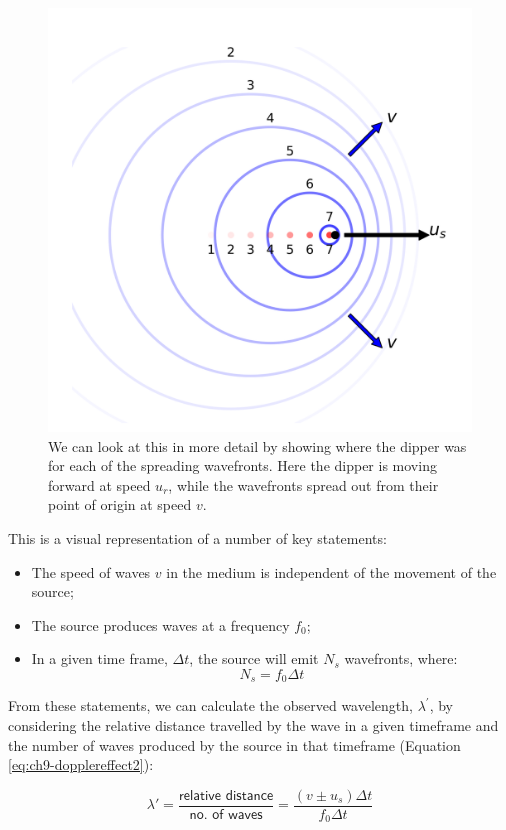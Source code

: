 \documentclass[
]{book}
\providecommand{\tightlist}{%
  \setlength{\itemsep}{0pt}\setlength{\parskip}{0pt}}
\begin{document}
\begin{figure}

{\centering \includegraphics[width=0.7\linewidth]{visualisations/ch9-doppler2} 

}

\caption{We can look at this in more detail by showing where the dipper was for each of the spreading wavefronts. Here the dipper is moving forward at speed $u_r$, while the wavefronts spread out from their point of origin at speed $v$.}\label{fig:ch9-dopplerdipper2}
\end{figure}

This is a visual representation of a number of key statements:

\begin{itemize}
\tightlist
\item
  The speed of waves \(v\) in the medium is independent of the movement of the source;
\item
  The source produces waves at a frequency \(f_0\);
\item
  In a given time frame, \(\Delta t\), the source will emit \(N_s\) wavefronts, where:
  \begin{equation}
  N_s = f_0 \Delta t
  \end{equation}
\end{itemize}

From these statements, we can calculate the observed wavelength, \(\lambda^\prime\), by considering the relative distance travelled by the wave in a given timeframe and the number of waves produced by the source in that timeframe (Equation \eqref{eq:ch9-dopplereffect2}):

\begin{equation}
\lambda' = \frac{\textsf{relative distance}}{\textsf{no. of waves}} = \frac{(v\pm u_{s})\Delta t}{f_{0}\Delta t}
\label{eq:ch9-dopplereffect2}
\end{equation}
\end{document}
